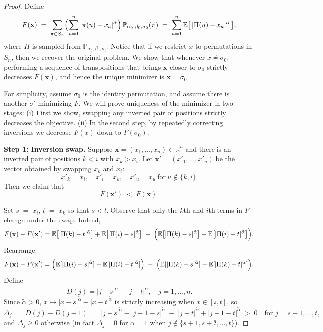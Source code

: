 \documentclass{article}
\renewcommand{\P}{\mathbb{P}}
\newcommand{\R}{\mathbb{R}}
\begin{document}
\begin{proof}
Define
\[
F(\mathbf x)\;=\;\sum_{\pi\in S_n}\Bigl(\sum_{u=1}^n|\pi(u)-x_u|^{\tilde\alpha}\Bigr)\,\P_{\alpha_0,\beta_0,\sigma_0}(\pi)
\;=\;\sum_{u=1}^n\mathbb{E}\bigl[\,|\Pi(u)-x_u|^{\tilde\alpha}\,\bigr],
\]
where  $\Pi$ is sampled from $\P_{\alpha_0,\beta_0,\sigma_0}$.
Notice that if we restrict $x$ to permutations in $S_n$, then we recover the original problem. 
We show that whenever $x\neq\sigma_0$, performing a sequence of transpositions that brings $\mathbf x$ closer to $\sigma_0$ strictly decreases $F(\mathbf x)$, and hence the unique minimizer is $\mathbf x=\sigma_0$.

For simplicity, assume $\sigma_0$ is the identity permutation, and assume there is another $\sigma'$ minimizing $F$. 
We will prove uniqueness of the minimizer in two stages:
(i) First we show, swapping any inverted pair of positions strictly decreases the objective.
(ii) In the second step, by repeatedly correcting inversions we decrease $F(x)$ down to $F(\sigma_0)$.

\noindent\textbf{Step 1: Inversion swap.}  Suppose $\mathbf x=(x_1,\dots,x_n)\in\R^n$ and there is an inverted pair of positions 
$k<i$ with 
$x_k>x_i$.
Let $\mathbf x'=(x'_1,\dots,x'_n)$ be the vector obtained by swapping $x_k$ and $x_i$:
\[
x'_k = x_i,\quad x'_i = x_k,\quad x'_u = x_u\ \text{for}\ u\notin\{k,i\}.
\]
Then  we claim that
\[
F(\mathbf x') \;<\; F(\mathbf x).
\]

Set  $s \;=\; x_i$,  $t \;=\; x_k$
so that $s<t$.  Observe that only the $k$th and $i$th terms in $F$ change under the swap.  Indeed,
\[
F(\mathbf x)-F(\mathbf x')
= \mathbb{E}\bigl[|\Pi(k) - t|^{\tilde\alpha}\bigr] + \mathbb{E}\bigl[|\Pi(i) - s|^{\tilde\alpha}\bigr]
  \;-\;\Bigl(\mathbb{E}\bigl[|\Pi(k) - s|^{\tilde\alpha}\bigr] + \mathbb{E}\bigl[|\Pi(i) - t|^{\tilde\alpha}\bigr]\Bigr).
\]
Rearrange:
\[
F(\mathbf x)-F(\mathbf x')
= \Bigl(\mathbb{E}[|\Pi(i) - s|^{\tilde\alpha}]-\mathbb{E}[|\Pi(i) - t|^{\tilde\alpha}]\Bigr)
  \;-\;\Bigl(\mathbb{E}[|\Pi(k) - s|^{\tilde\alpha}]-\mathbb{E}[|\Pi(k) - t|^{\tilde\alpha}]\Bigr).
\]
Define 
\[
D(j)=|j-s|^{\tilde\alpha}-|j-t|^{\tilde\alpha},\quad j=1,\dots,n.
\]
Since ${\tilde\alpha}>0$, $x\mapsto|x-s|^{\tilde\alpha}-|x-t|^{\tilde\alpha}$ is strictly increasing when $x\in[s,t]$, so
\[
\Delta_j
\;=\;
D(j)-D(j-1)
\;=\;
\bigl|j-s\bigr|^{\tilde\alpha}-\bigl|j-1-s\bigr|^{\tilde\alpha}
\;-\;\bigl|j-t\bigr|^{\tilde\alpha}+\bigl|j-1-t\bigr|^{\tilde\alpha}
\;>\;0
\quad\text{for }j= s+1,\dots,t,
\]
and $\Delta_j\geq 0$ otherwise (in fact $\Delta_j=0$ for $\tilde\alpha=1$ when $j\not\in\{s+1,s+2,\ldots, t\}$). 


\end{proof}
\end{document}
